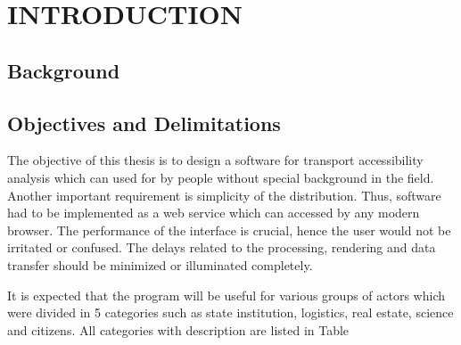 \section{ INTRODUCTION }

\subsection{ Background }

\subsection{ Objectives and Delimitations }
The objective of this thesis is to design a software for transport accessibility analysis
which can used for by people without special background in the field. Another important
requirement is simplicity of the distribution. Thus, software had to be implemented
as a web service which can accessed by any modern browser. The performance of the interface
is crucial, hence the user would not be irritated or confused. The delays related to the processing,
rendering and data transfer should be minimized or illuminated completely.

It is expected that the program will be useful for various groups of actors which
were divided in 5 categories such as state institution, logistics, real estate, science
and citizens. All categories with description are listed in Table~

